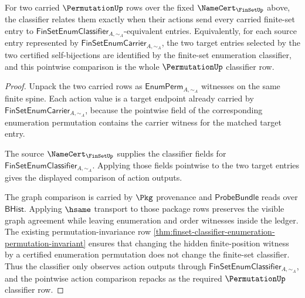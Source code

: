 \begin{theorem}
\label{thm:permutation-classifier-obligation}
For two carried $\PermutationUp$ rows over the fixed $\NameCert_{\FinSetUp}$ above, the classifier relates them exactly when their actions send every carried finite-set entry to $\mathsf{FinSetEnumClassifier}_{A,\sim_A}$-equivalent entries. Equivalently, for each source entry represented by $\mathsf{FinSetEnumCarrier}_{A,\sim_A}$, the two target entries selected by the two certified self-bijections are identified by the finite-set enumeration classifier, and this pointwise comparison is the whole $\PermutationUp$ classifier row.
\end{theorem}
\begin{proof}
Unpack the two carried rows as $\mathsf{EnumPerm}_{A,\sim_A}$ witnesses on the same finite spine. Each action value is a target endpoint already carried by $\mathsf{FinSetEnumCarrier}_{A,\sim_A}$, because the pointwise field of the corresponding enumeration permutation contains the carrier witness for the matched target entry.

The source $\NameCert_{\FinSetUp}$ supplies the classifier fields for $\mathsf{FinSetEnumClassifier}_{A,\sim_A}$. Applying those fields pointwise to the two target entries gives the displayed comparison of action outputs.

The graph comparison is carried by $\Pkg$ provenance and $\mathsf{ProbeBundle}$ reads over $\mathsf{BHist}$. Applying $\hsame$ transport to those package rows preserves the visible graph agreement while leaving enumeration and order witnesses inside the ledger. The existing permutation-invariance row \autoref{thm:finset-classifier-enumeration-permutation-invariant} ensures that changing the hidden finite-position witness by a certified enumeration permutation does not change the finite-set classifier. Thus the classifier only observes action outputs through $\mathsf{FinSetEnumClassifier}_{A,\sim_A}$, and the pointwise action comparison repacks as the required $\PermutationUp$ classifier row.
\end{proof}

